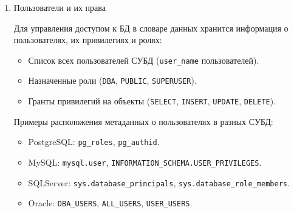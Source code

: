 \begin{enumerate}
    Пример SQL-запроса (PostgreSQL, получение ограничений таблицы):
    \begin{lstlisting}[language=SQL]
    SELECT conname, contype, conrelid::regclass AS table_name 
    FROM pg_constraint 
    WHERE conrelid = 'employees'::regclass; 
    \end{lstlisting}

    Пример SQL-запроса (MySQL, ограничение \texttt{UNIQUE} на \texttt{email} в таблице \texttt{users}):
    \begin{lstlisting}[language=SQL]
    ALTER TABLE users
    ADD CONSTRAINT unique_email UNIQUE (email);    
    \end{lstlisting}

    Пример SQL-запроса (PostgreSQL, ограничение \texttt{FOREIGN KEY} для \texttt{orders.customer\_id}, ссылающееся на \texttt{customers.id}):
    \begin{lstlisting}[language=SQL]
    ALTER TABLE orders
    ADD CONSTRAINT fk_customer FOREIGN KEY (customer_id)
    REFERENCES customers(id) ON DELETE CASCADE;
    \end{lstlisting}

    \item Пользователи и их права \autocite{MicrosoftLearnSQLserverPerm, oracledbdoc3}

    Для управления доступом к БД в словаре данных хранится информация о пользователях, их привилегиях и ролях:
    \begin{itemize}
        \item Список всех пользователей СУБД (\texttt{user\_name} пользователей).
        \item Назначенные роли (\texttt{DBA}, \texttt{PUBLIC}, \texttt{SUPERUSER}).
        \item Гранты привилегий на объекты (\texttt{SELECT}, \texttt{INSERT}, \texttt{UPDATE}, \texttt{DELETE}).
    \end{itemize}

	Примеры расположения метаданных о пользователях в разных СУБД:

    \begin{itemize}
        \item PostgreSQL: \texttt{pg\_roles}, \texttt{pg\_authid}.
        \item MySQL: \texttt{mysql.user}, \texttt{INFORMATION\_SCHEMA.USER\_PRIVILEGES}.
        \item SQLServer: \texttt{sys.database\_principals}, \texttt{sys.database\_role\_members}.
        \item Oracle: \texttt{DBA\_USERS}, \texttt{ALL\_USERS}, \texttt{USER\_USERS}.
    \end{itemize}


\end{enumerate}

